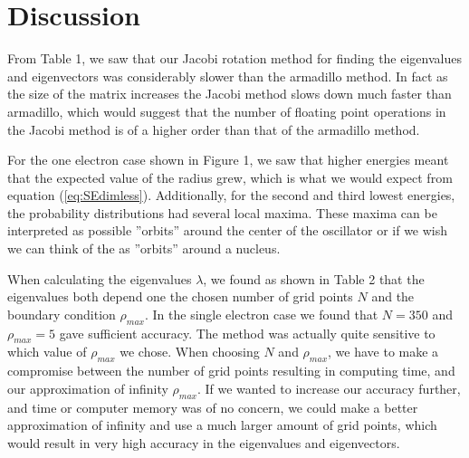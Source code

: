 \documentclass[norsk,a4paper,12pt]{article}
\begin{document}
\section{Discussion}
From Table 1, we saw that our Jacobi rotation method for finding the eigenvalues and eigenvectors was considerably slower than the armadillo method. In fact as the size of the matrix increases the Jacobi method slows down much faster than armadillo, which would suggest that the number of floating point operations in the Jacobi method is of a higher order than that of the armadillo method. 

For the one electron case shown in Figure 1, we saw that higher energies meant that the expected value of the radius grew, which is what we would expect from equation (\ref{eq:SEdimless}). Additionally, for the second and third lowest energies, the probability distributions had several local maxima. These maxima can be interpreted as possible ''orbits'' around the center of the oscillator or if we wish we can think of the as ''orbits'' around a nucleus.

When calculating the eigenvalues $\lambda$, we found as shown in Table 2 that the eigenvalues both depend one the chosen number of grid points $N$ and the boundary condition $\rho_{max}$. In the single electron case we found that $N=350$ and $\rho_{max} = 5$ gave sufficient accuracy. The method was actually quite sensitive to which value of $\rho_{max}$ we chose. When choosing $N$ and $\rho_{max}$, we have to make a compromise between the number of grid points resulting in computing time, and our approximation of infinity $\rho_{max}$. If we wanted to increase our accuracy further, and time or computer memory was of no concern, we could make a better approximation of infinity and use a much larger amount of grid points, which would result in very high accuracy in the eigenvalues and eigenvectors.
\end{document}
